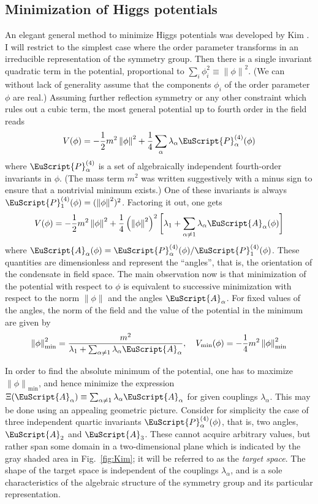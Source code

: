 \documentclass[final,3p,times,12pt,a4paper,sort&compress]{elsarticle}
\newcommand\PP{\EuScript{P}}                %
\newcommand\AP{\EuScript{A}}                %
\newcommand\nor[1]{\left\|#1\right\|}       %
\begin{document}
\subsection{Minimization of Higgs potentials}
An elegant general method to minimize Higgs potentials was developed by Kim
\cite{Kim:1981xu}. I will restrict to the simplest case where the order
parameter transforms in an irreducible representation of the symmetry group.
Then there is a single invariant quadratic term in the potential, proportional
to $\sum_i\phi_i^2\equiv\nor\phi^2$. (We can without lack of generality assume
that the components $\phi_i$ of the order parameter $\phi$ are real.) Assuming
further reflection symmetry or any other constraint which rules out a cubic
term, the most general potential up to fourth order in the field reads
\begin{equation}
V(\phi)=-\frac12m^2\nor\phi^2+\frac14\sum_\alpha\lambda_\alpha
\PP^{(4)}_\alpha(\phi)
\label{GLpot}
\end{equation}
where $\PP_\alpha^{(4)}$ is a set of algebraically independent fourth-order
invariants in $\phi$. (The mass term $m^2$ was written suggestively with a
minus sign to ensure that a nontrivial minimum exists.) One of these invariants
is always $\PP^{(4)}_1(\phi)=(\nor\phi^2)^2$. Factoring it out, one gets
\begin{equation}
V(\phi)=-\frac12m^2\nor\phi^2+\frac14\left(\nor\phi^2\right)^2
\biggl[\lambda_1+\sum_{\alpha\neq1}\lambda_\alpha\AP_\alpha(\phi)\biggr]
\end{equation}
where $\AP_\alpha(\phi)=\PP^{(4)}_\alpha(\phi)/\PP^{(4)}_1(\phi)$. These
quantities are dimensionless and represent the ``angles'', that is, the
orientation of the condensate in field space. The main observation now is that
minimization of the potential with respect to $\phi$ is equivalent to
successive minimization with respect to the norm $\nor\phi$ and the angles
$\AP_\alpha$. For fixed values of the angles, the norm of the field and the
value of the potential in the minimum are given by
\begin{equation}
\nor\phi^2_{\text{min}}=\frac{m^2}{\lambda_1+\sum_{\alpha\neq1}
\lambda_\alpha\AP_\alpha},\quad
V_{\text{min}}(\phi)=-\frac14m^2\nor\phi^2_{\text{min}}
\label{kimaux}
\end{equation}

In order to find the absolute minimum of the potential, one has to maximize
$\nor\phi_{\text{min}}$, and hence minimize the expression
$\Xi(\AP_\alpha)\equiv\sum_{\alpha\neq1}\lambda_\alpha\AP_\alpha$ for given
couplings $\lambda_\alpha$. This may be done using an appealing geometric
picture. Consider for simplicity the case of three independent quartic
invariants $\PP_\alpha^{(4)}(\phi)$, that is, two angles, $\AP_2$ and $\AP_3$.
These cannot acquire arbitrary values, but rather span some domain in a
two-dimensional plane which is indicated by the gray shaded area in
Fig.~\ref{fig:Kim}; it will be referred to as the \emph{target space}. The shape
of the target space is independent of the couplings $\lambda_\alpha$,
and is a sole characteristics of the algebraic structure of the symmetry group
and its particular representation.
\end{document}
